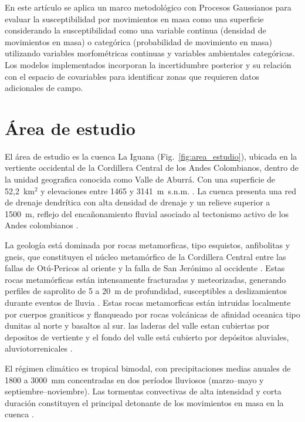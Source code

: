 \documentclass[12pt, a4paper]{article}
\begin{document}
En este artículo se aplica un marco metodológico con Procesos Gaussianos para evaluar la susceptibilidad por movimientos en masa como una superficie considerando 
la susceptibilidad como una variable continua (densidad de movimientos en masa) o categórica (probabilidad de movimiento en masa)
 utilizando variables morfométricas continuas y variables ambientales categóricas. Los modelos implementados incorporan la incertidumbre posterior y su relación 
 con el espacio de covariables para identificar zonas que requieren datos adicionales de campo.


\section{Área de estudio}

El área de estudio es la cuenca La Iguana (Fig.~\ref{fig:area_estudio}), ubicada en la vertiente occidental de la Cordillera
Central de los Andes Colombianos, dentro de la unidad geografica conocida como Valle de Aburrá. Con una superficie de 52{,}2~km$^2$ 
y elevaciones entre 1465 y 3141~m~s.n.m. \citep{AristizabalYokota2008}. La cuenca presenta una red de drenaje dendrítica con alta densidad de drenaje
 y un relieve superior a 1500~m, reflejo del encañonamiento fluvial asociado al tectonismo activo de los Andes colombianos
\citep{AristizabalYokota2008, GarciaDelgado2020}.

La geología está dominada por rocas metamorficas, tipo esquistos, anfibolitas y gneis, que constituyen el núcleo metamórfico de la 
Cordillera Central entre las fallas de Otú-Pericos
al oriente y la falla de San Jerónimo al occidente \citep{MayaGonzalez1995, Vinasco2006}. Estas rocas metamórficas están
intensamente fracturadas y meteorizadas, generando perfiles de saprolito de 5 a 20~m de profundidad, susceptibles a deslizamientos
 durante eventos de lluvia \citep{Aristizabal2023}. Estas rocas metamorficas están intruidas localmente por cuerpos graniticos y 
 flanqueado por rocas volcánicas de afinidad oceanica tipo dunitas al norte y basaltos al sur. las laderas del valle estan cubiertas por 
 depositos de vertiente \citep{Garcia2006} y el fondo del valle está cubierto por depósitos aluviales, aluviotorrenicales \citep{MayaGonzalez1995}.

El régimen climático es tropical bimodal, con precipitaciones medias anuales de 1800 a 3000~mm concentradas en dos períodos
lluviosos (marzo--mayo y septiembre--noviembre). Las tormentas convectivas de alta intensidad y corta duración constituyen el
principal detonante de los movimientos en masa en la cuenca \citep{Aristizabal2023}.
\end{document}
